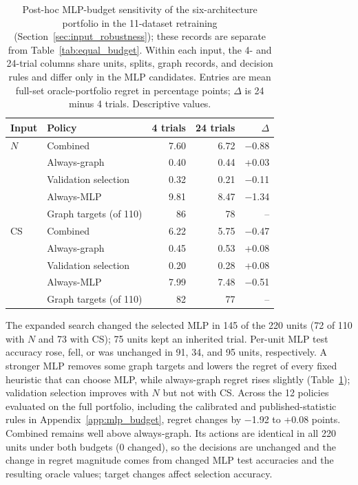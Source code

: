 \begin{table}[t]
\centering
\caption{Post-hoc MLP-budget sensitivity of the six-architecture portfolio in the 11-dataset retraining (Section~\ref{sec:input_robustness}); these records are separate from Table~\ref{tab:equal_budget}. Within each input, the 4- and 24-trial columns share units, splits, graph records, and decision rules and differ only in the MLP candidates. Entries are mean full-set oracle-portfolio regret in percentage points; $\Delta$ is 24 minus 4 trials. Descriptive values.}
\label{tab:mlp_budget}
\small
\setlength{\tabcolsep}{3.5pt}
\begin{tabular}{@{}llrrr@{}}
\toprule
Input & Policy & 4 trials & 24 trials & $\Delta$ \\
\midrule
$N$ & Combined & 7.60 & 6.72 & $-$0.88 \\
 & Always-graph & 0.40 & 0.44 & +0.03 \\
 & Validation selection & 0.32 & 0.21 & $-$0.11 \\
 & Always-MLP & 9.81 & 8.47 & $-$1.34 \\
 & Graph targets (of 110) & 86 & 78 & -- \\
\midrule
CS & Combined & 6.22 & 5.75 & $-$0.47 \\
 & Always-graph & 0.45 & 0.53 & +0.08 \\
 & Validation selection & 0.20 & 0.28 & +0.08 \\
 & Always-MLP & 7.99 & 7.48 & $-$0.51 \\
 & Graph targets (of 110) & 82 & 77 & -- \\
\bottomrule
\end{tabular}
\end{table}

The expanded search changed the selected MLP in 145 of the 220 units (72 of 110 with $N$ and 73 with CS); 75 units kept an inherited trial. Per-unit MLP test accuracy rose, fell, or was unchanged in 91, 34, and 95 units, respectively. A stronger MLP removes some graph targets and lowers the regret of every fixed heuristic that can choose MLP, while always-graph regret rises slightly (Table~\ref{tab:mlp_budget}); validation selection improves with $N$ but not with CS. Across the 12 policies evaluated on the full portfolio, including the calibrated and published-statistic rules in Appendix~\ref{app:mlp_budget}, regret changes by $-$1.92 to +0.08 points. Combined remains well above always-graph. Its actions are identical in all 220 units under both budgets (0 changed), so the decisions are unchanged and the change in regret magnitude comes from changed MLP test accuracies and the resulting oracle values; target changes affect selection accuracy.

